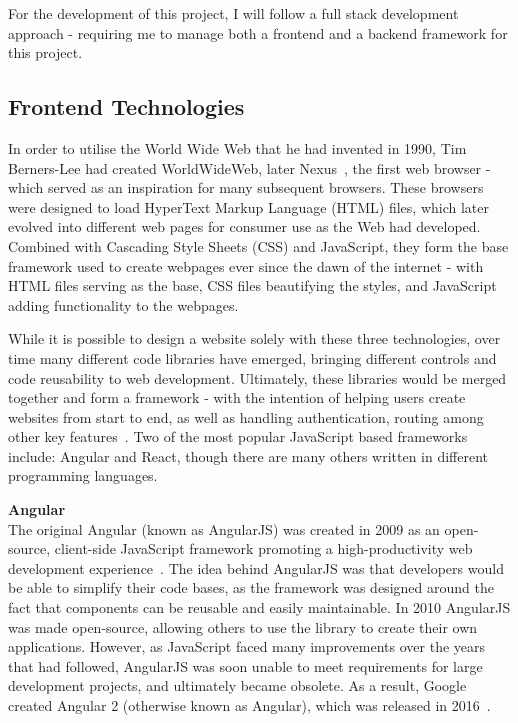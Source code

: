 \documentclass[]{final_report}
\begin{document}

For the development of this project, I will follow a full stack development approach - requiring me to manage both a frontend and a backend framework for this project.

\subsection{Frontend Technologies}

In order to utilise the World Wide Web that he had invented in 1990, Tim Berners-Lee had created WorldWideWeb, later Nexus~\cite{NEXUS}, the first web browser - which served as an inspiration for many subsequent browsers. These browsers were designed to load HyperText Markup Language (HTML) files, which later evolved into different web pages for consumer use as the Web had developed. Combined with Cascading Style Sheets (CSS) and JavaScript, they form the base framework used to create webpages ever since the dawn of the internet - with HTML files serving as the base, CSS files beautifying the styles, and JavaScript adding functionality to the webpages.

While it is possible to design a website solely with these three technologies, over time many different code libraries have emerged, bringing different controls and code reusability to web development. Ultimately, these libraries would be merged together and form a framework - with the intention of helping users create websites from start to end, as well as handling authentication, routing among other key features~\cite{FRAMEWORKS}. Two of the most popular JavaScript based frameworks include: Angular and React, though there are many others written in different programming languages.

\textbf{Angular}\\
The original Angular (known as AngularJS) was created in 2009 as an open-source, client-side JavaScript framework promoting a high-productivity web development experience~\cite{BRANAS_ANGULAR}. The idea behind AngularJS was that developers would be able to simplify their code bases, as the framework was designed around the fact that components can be reusable and easily maintainable. In 2010 AngularJS was made open-source, allowing others to use the library to create their own applications. However, as JavaScript faced many improvements over the years that had followed, AngularJS was soon unable to meet requirements for large development projects, and ultimately became obsolete. As a result, Google created Angular 2 (otherwise known as Angular), which was released in 2016~\cite{ANGULAR_ANALYSIS}.
\end{document}
